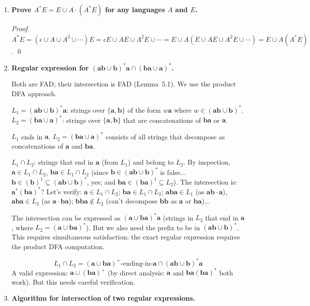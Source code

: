\begin{enumerate}[{6.}1.]
\item \textbf{Prove $A^*E=E\cup A\cdot(A^*E)$ for any languages $A$ and $E$.}

\begin{proof}
$A^*E=(\epsilon\cup A\cup A^2\cup\cdots)E=\epsilon E\cup AE\cup A^2E\cup\cdots=E\cup A(E\cup AE\cup A^2E\cup\cdots)=E\cup A(A^*E)$. \qed
\end{proof}

\item \textbf{Regular expression for $(\pmb{ab}\cup\pmb{b})^*\pmb{a}\cap(\pmb{ba}\cup\pmb{a})^*$.}

Both are FAD; their intersection is FAD (Lemma~5.1).  We use the product DFA approach.

$L_1=(\pmb{ab}\cup\pmb{b})^*\pmb{a}$: strings over $\{\pmb{a},\pmb{b}\}$ of the form $w\pmb{a}$ where $w\in(\pmb{ab}\cup\pmb{b})^*$.
$L_2=(\pmb{ba}\cup\pmb{a})^*$: strings over $\{\pmb{a},\pmb{b}\}$ that are concatenations of $\pmb{ba}$ or $\pmb{a}$.

$L_1$ ends in $\pmb{a}$.  $L_2=(\pmb{ba}\cup\pmb{a})^*$ consists of all strings that decompose as concatenations of $\pmb{a}$ and $\pmb{ba}$.

$L_1\cap L_2$: strings that end in $\pmb{a}$ (from $L_1$) and belong to $L_2$.  By inspection, $\pmb{a}\in L_1\cap L_2$, $\pmb{ba}\in L_1\cap L_2$ (since $\pmb{b}\in(\pmb{ab}\cup\pmb{b})^*$ is false... $\pmb{b}\in(\pmb{b})^1\subseteq(\pmb{ab}\cup\pmb{b})^*$, yes; and $\pmb{ba}\in(\pmb{ba})^1\subseteq L_2$).  The intersection is: $\pmb{a}^*(\pmb{ba})^*$? Let's verify: $\pmb{a}\in L_1\cap L_2$; $\pmb{ba}\in L_1\cap L_2$; $\pmb{aba}\in L_1$ (as $\pmb{ab}\cdot\pmb{a}$), $\pmb{aba}\in L_2$ (as $\pmb{a}\cdot\pmb{ba}$); $\pmb{bba}\notin L_2$ (can't decompose $\pmb{bb}$ as $\pmb{a}$ or $\pmb{ba}$)...

The intersection can be expressed as $(\pmb{a}\cup\pmb{ba})^*\pmb{a}$ (strings in $L_2$ that end in $\pmb{a}$, where $L_2=(\pmb{a}\cup\pmb{ba})^*$).  But we also need the prefix to be in $(\pmb{ab}\cup\pmb{b})^*$.  This requires simultaneous satisfaction; the exact regular expression requires the product DFA computation.

\[
  L_1\cap L_2 = (\pmb{a}\cup\pmb{ba})^+\text{-ending-in-}\pmb{a}\cap(\pmb{ab}\cup\pmb{b})^*\pmb{a}
\]
A valid expression: $\pmb{a}\cup(\pmb{ba})^+$ (by direct analysis: $\pmb{a}$ and $\pmb{ba}(\pmb{ba})^*$ both work).  But this needs careful verification.

\item \textbf{Algorithm for intersection of two regular expressions.}


\end{enumerate}
